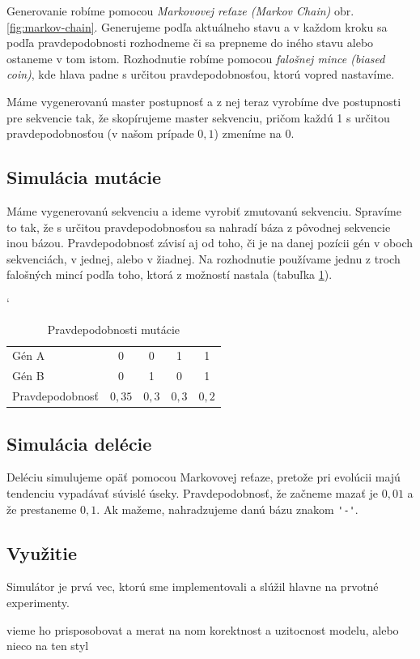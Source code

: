Generovanie robíme pomocou \textit{Markovovej reťaze (Markov Chain)} obr. \ref{fig:markov-chain}. Generujeme podľa aktuálneho stavu a v každom kroku sa podľa pravdepodobnosti rozhodneme či sa prepneme do iného stavu alebo ostaneme v tom istom. Rozhodnutie robíme pomocou \textit{falošnej mince (biased coin)}, kde hlava padne s určitou pravdepodobnosťou, ktorú vopred nastavíme.


Máme vygenerovanú master postupnosť a z nej teraz vyrobíme dve postupnosti pre sekvencie tak, že skopírujeme master sekvenciu, pričom každú 1 s určitou pravdepodobnosťou (v našom prípade $0,1$) zmeníme na 0.

\subsection{Simulácia mutácie}

Máme vygenerovanú sekvenciu a ideme vyrobiť zmutovanú sekvenciu. Spravíme to tak, že s určitou pravdepodobnosťou sa nahradí báza z pôvodnej sekvencie inou bázou. Pravdepodobnosť závisí aj od toho, či je na danej pozícii gén v oboch sekvenciách, v jednej, alebo v žiadnej. Na rozhodnutie používame jednu z troch falošných mincí podľa toho, ktorá z možností nastala (tabuľka \ref{tab:mutation-prob}).

\begin{table}[h]
\catcode` %
\centering
\begin{tabular}{lcccc}
Gén A & 0 & 0 & 1 & 1\\
Gén B & 0 & 1 & 0 & 1\\
Pravdepodobnosť & $0,35$ & $0,3$ & $0,3$ & $0,2$\\
\end{tabular}
\caption{Pravdepodobnosti mutácie}
\label{tab:mutation-prob}
\end{table}

\subsection{Simulácia delécie}
Deléciu simulujeme opäť pomocou Markovovej reťaze, pretože pri evolúcii majú tendenciu vypadávať súvislé úseky. Pravdepodobnosť, že začneme mazať je $0,01$ a že prestaneme $0,1$.
Ak mažeme, nahradzujeme danú bázu znakom {\verb+'-'+}.

\subsection{Využitie}

Simulátor je prvá vec, ktorú sme implementovali a slúžil hlavne na prvotné experimenty.

\todo vieme ho prisposobovat a merat na nom korektnost a uzitocnost modelu, alebo nieco na ten styl
